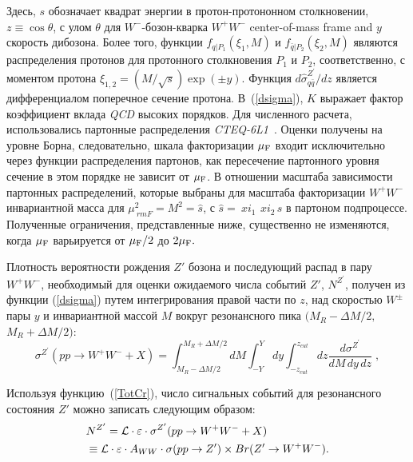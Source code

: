 Здесь, $s$ обозначает квадрат энергии в протон-протононном столкновении,
$z\equiv\cos\theta$, с улом $\theta$ для $W^-$-бозон-кварка $W^+W^-$ center-of-mass frame and $y$ скорость дибозона. Более того, функции $f_{q|P_1}(\xi_{1},M)$ и $f_{\bar
	q|P_2}(\xi_{2},M)$ являются распределения протонов для
протонного столкновения $P_1$ и $P_2$, соответственно, с моментом протона $\xi_{1,2}=(M/\sqrt
s)\exp(\pm y)$. Функция ${d\hat
	\sigma_{q \bar q}^{Z^\prime}}/{dz}$ является дифференциалом
поперечное сечение протона. В~(\ref{dsigma}), $K$ выражает фактор коэффициент вклада \textit{QCD} высоких порядков.
Для численного расчета, использовались партонные распределения \textit{CTEQ-6L1}~\cite{2part-pankov}. Оценки получены на уровне Борна,
следовательно, шкала факторизации $ \mu_{\rm F} $ входит исключительно через
функции распределения партонов, как пересечение партонного уровня
сечение в этом порядке не зависит от $ \mu_{\rm F} $. В отношении
масштаба зависимости партонных распределений, которые выбраны для
масштаба факторизации $ W ^ + W ^ - $ инвариантной масса для $ \mu _ {\ rm
	F} ^ 2 = M ^ 2 = \hat {s} $, с $ \hat {s} = \ xi_1 \, \ xi_2 \, s $ в партоном
подпроцессе. Полученные ограничения, представленные ниже, существенно не изменяются, когда
$ \mu _ {\rm F} $ варьируется от $ \mu _ {\rm F} / 2 $ до $ 2 \mu _ {\rm F}. $

Плотность вероятности рождения $ Z '$ бозона и
последующий распад в пару $ W ^ + W ^ - $, необходимый для оценки
ожидаемого числа событий $ Z '$, $ N ^ {Z ^ \prime} $, получен
из функции (\ref{dsigma}) путем интегрирования правой части по $ z $,
над скоростью $ W ^ \pm $ пары $ y $ и инвариантной массой $ M $
вокруг резонансного пика $ (M_R- \Delta M / 2, $ $ M_R + \Delta M / 2) $:
\begin{equation}
\sigma^{Z^\prime}{(pp\to W^+W^- + X)}  =\int_{M_{R}-\Delta
	M/2}^{M_{R}+\Delta M/2}d M \int_{-Y}^{Y}d y
\int_{-z_{cut}}^{z_{cut}}d
z\frac{d\sigma^{Z^\prime}}{d M\, d y\, d z}\;, \label{TotCr}
\end{equation}

Используя функцию~(\ref{TotCr}), число сигнальных событий для резонансного состояния $ Z '$ можно записать следующим образом:
\begin{align}
&N^{Z^\prime}= {\cal L}\cdot\varepsilon\cdot
\sigma^{Z^\prime}{(pp\to W^+W^- + X)}\nonumber \\ &\equiv {\cal
	L}\cdot\varepsilon\cdot A_{WW}\cdot \sigma(pp\to Z') \times {Br}(Z' \to W^+W^-).
\label{signal}
\end{align}


